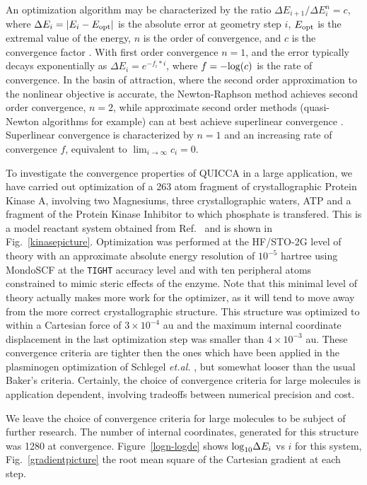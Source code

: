 \documentclass[prl,twocolumn,showpacs,twocolumngrid,superbib]{revtex4}
\begin{document}
An optimization algorithm may be characterized by the ratio ${\Delta E_{i+1}}/{\Delta E_{i}^n} =c$,
where $\Delta E_i = |E_{i}-E_{\rm opt}| $ is the absolute error at geometry step $i$,
$E_{\rm opt}$ is the extremal value of the energy, $n$ is the order of convergence, 
and $c$ is the convergence factor \cite{AQuarteroni00}.  With first order convergence $n=1$, and
the error typically decays exponentially as $\Delta E_i = e^{-f_i*i}$, where $f=-{\rm log}(c)$ is the 
rate of convergence. In the basin of attraction, where the second order approximation 
to the nonlinear objective is accurate, the Newton-Raphson method achieves second order convergence,
$ n=2$, while approximate second order methods (quasi-Newton algorithms for example) can 
at best achieve superlinear convergence \cite{RFletcher81,GFogarasi92}.   Superlinear 
convergence is characterized by $n=1$ and an increasing rate of convergence $f$, equivalent to 
$\lim_{i \to \infty} c_i = 0$.  

To investigate the convergence properties of QUICCA in a large application, we have carried out
optimization of a 263 atom fragment of crystallographic Protein Kinase A, involving two Magnesiums,
three crystallographic waters, ATP and a fragment of the Protein Kinase Inhibitor to which phosphate 
is transfered. This is a model reactant system obtained from Ref.~ and is shown in 
Fig.~\ref{kinasepicture}.  Optimization was performed at the HF/STO-2G level of theory with an 
approximate absolute energy resolution of $10^{-5}$ hartree using MondoSCF \cite{MondoSCF} at the 
{\tt TIGHT} accuracy level and with ten peripheral atoms  constrained to mimic steric effects of the enzyme.  
Note that this minimal level of theory actually makes more work for the optimizer, as it will tend to 
move away from the more correct crystallographic structure.   This structure was optimized to within a 
Cartesian force of $3\times10^{-4}$ au and 
the maximum internal coordinate displacement in 
the last optimization step was smaller than
$4\times10^{-3}$ au. These convergence criteria are 
tighter then the ones which have been
applied in the plasminogen optimization of Schlegel {\it et.al.} 
\cite{HSchlegel00}, but somewhat looser than the usual Baker's criteria.
Certainly, the choice of convergence criteria for large molecules 
is application dependent, involving tradeoffs between 
numerical precision and cost.

We leave the choice of convergence criteria for large molecules 
to be subject of further research.
The number of internal coordinates, generated for this structure was 1280 at convergence.  Figure~\ref{logn-logde} 
shows ${\rm log}_{10} \Delta E_i$ vs $i$ for this system, Fig.~\ref{gradientpicture} the root mean square 
of the Cartesian gradient at each step.
\end{document}
